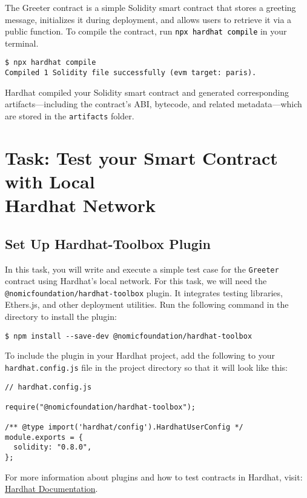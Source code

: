 \documentclass[12pt]{article}
\newcommand{\codeblack}[1]{%
  \texttt{\colorbox{black!7}{\textcolor{black}{#1}}}%
}
\begin{document}
The Greeter contract is a simple Solidity smart contract that stores a greeting message, initializes it during deployment, and allows users to retrieve it via a public function. To compile the contract, run \codeblack{npx hardhat compile} in your terminal.

\begin{verbatim}
$ npx hardhat compile
Compiled 1 Solidity file successfully (evm target: paris).
\end{verbatim}

Hardhat compiled your Solidity smart contract and generated corresponding artifacts—including the contract's ABI, bytecode, and related metadata—which are stored in the \texttt{artifacts} folder.

\section{Task: Test your Smart Contract with Local \\ Hardhat Network}

\subsection{Set Up Hardhat-Toolbox Plugin}
In this task, you will write and execute a simple test case for the \texttt{Greeter} contract using Hardhat's local network. For this task, we will need the \texttt{@nomicfoundation/hardhat-toolbox} plugin. It integrates testing libraries, Ethers.js, and other deployment utilities. Run the following command in the directory to install the plugin:

\begin{verbatim}
$ npm install --save-dev @nomicfoundation/hardhat-toolbox
\end{verbatim}

To include the plugin in your Hardhat project, add the following to your \texttt{hardhat.config.js} file in the project directory so that it will look like this:

\begin{verbatim}
// hardhat.config.js

require("@nomicfoundation/hardhat-toolbox");

/** @type import('hardhat/config').HardhatUserConfig */
module.exports = {
  solidity: "0.8.0",
};
\end{verbatim}
For more information about plugins and how to test contracts in Hardhat, visit: \\ \href{https://hardhat.org/docs}{Hardhat Documentation}.
\end{document}
